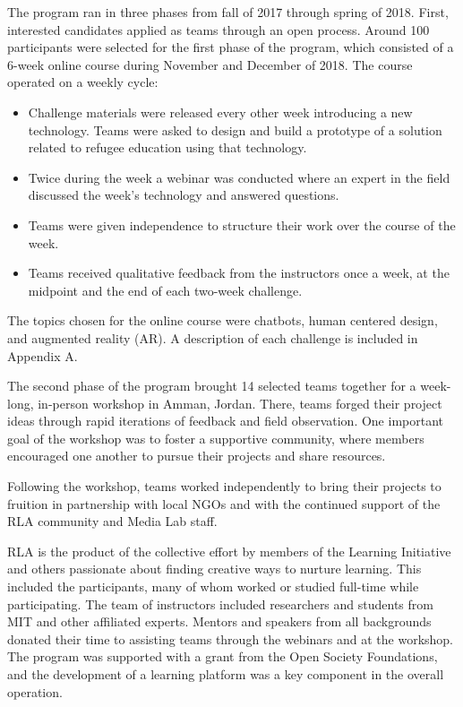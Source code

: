 \documentclass[12pt,twoside]{mitthesis}
\newcommand{\draft}[1]{{\color{blue} #1}}
\begin{document}
\draft{The program ran in three phases from fall of 2017 through spring of 2018. First, interested candidates applied as teams through an open process. Around 100 participants were selected for the first phase of the program, which consisted of a 6-week online course during November and December of 2018. The course operated on a weekly cycle:
\begin{itemize}
\item Challenge materials were released every other week introducing a new technology. Teams were asked to design and build a prototype of a solution related to refugee education using that technology.
\item Twice during the week a webinar was conducted where an expert in the field discussed the week's technology and answered questions.
\item Teams were given independence to structure their work over the course of the week.
\item Teams received qualitative feedback from the instructors once a week, at the midpoint and the end of each two-week challenge.
\end{itemize}
The topics chosen for the online course were chatbots, human centered design, and augmented reality (AR). A description of each challenge is included in Appendix A.}

The second phase of the program brought 14 selected teams together for a week-long, in-person workshop in Amman, Jordan. There, teams forged their project ideas through rapid iterations of feedback and field observation. One important goal of the workshop was to foster a supportive community, where members encouraged one another to pursue their projects and share resources.

Following the workshop, teams worked independently to bring their projects to fruition in partnership with local NGOs and with the continued support of the RLA community and Media Lab staff.~\cite{rla}

RLA is the product of the collective effort by members of the Learning Initiative and others passionate about finding creative ways to nurture learning. This included the participants, many of whom worked or studied full-time while participating. The team of instructors included researchers and students from MIT and other affiliated experts. Mentors and speakers from all backgrounds donated their time to assisting teams through the webinars and at the workshop. The program was supported with a grant from the Open Society Foundations, and the development of a learning platform was a key component in the overall operation.
\end{document}
